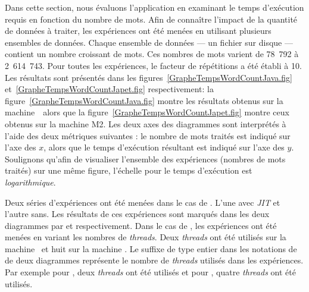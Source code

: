 

Dans cette section, nous 
\'evaluons l'application  en examinant le temps d'ex\'ecution requis en fonction du nombre de mots. Afin de conna\^itre l'impact de la quantit\'e de donn\'ees \`a traiter, les exp\'eriences ont \'et\'e men\'ees en utilisant plusieurs ensembles de donn\'ees. Chaque ensemble de donn\'ees --- un fichier sur disque --- contient un nombre croissant de mots. Ces nombres de mots varient de 78~792 \`a 2~614~743. Pour toutes les exp\'eriences, le facteur de r\'ep\'etitions a \'et\'e \'etabli \`a 10.  Les r\'esultats sont pr\'esent\'es dans les figures~\ref{GrapheTempsWordCountJava.fig} et~\ref{GrapheTempsWordCountJapet.fig} respectivement: la figure~\ref{GrapheTempsWordCountJava.fig} montre les résultats obtenus sur la machine~\ alors que la figure~\ref{GrapheTempsWordCountJapet.fig} montre ceux obtenus sur la machine M2.  Les deux axes des diagrammes sont interpr\'et\'es \`a l'aide des deux m\'etriques suivantes : le nombre de mots trait\'es est indiqu\'e sur l'axe des $x$, alors que le temps d'ex\'ecution r\'esultant est indiqu\'e sur l'axe des $y$.  Soulignons qu'afin de visualiser l'ensemble des exp\'eriences (nombres de mots trait\'es) sur une m\^eme figure, l'\'echelle pour le temps d'ex\'ecution est \emph{logarithmique}. 

Deux s\'eries d'exp\'eriences ont \'et\'e men\'ees dans le cas de . L'une avec \emph{JIT} et l'autre sans. Les r\'esultats de ces exp\'eriences sont marqu\'es dans les deux diagrammes par  et  respectivement. Dans le cas de , les exp\'eriences ont \'et\'e men\'ees en variant les nombres de \emph{threads}. Deux \emph{threads} ont \'et\'e utilis\'es sur la machine \ et huit sur la machine . Le suffixe de type entier dans les notations de  de deux diagrammes repr\'esente le nombre de \emph{threads} utilis\'es dans les exp\'eriences. Par exemple pour , deux \emph{threads} ont \'et\'e utilis\'es et pour , quatre \emph{threads} ont \'et\'e utilis\'es.



